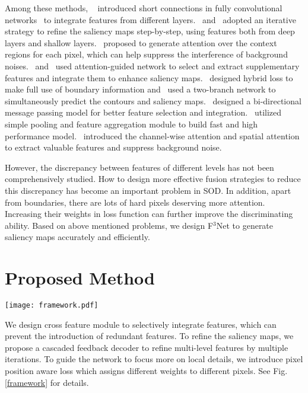 \documentclass[letterpaper]{article} %
\begin{document}
Among these methods, ~\cite{DSS} introduced short connections in fully convolutional networks~\cite{FCN} to integrate features from different layers.~\cite{R3Net} and~\cite{SRM} adopted an iterative strategy to refine the saliency maps step-by-step, using features both from deep layers and shallow layers.~\cite{PiCANet} proposed to generate attention over the context regions for each pixel, which can help suppress the interference of background noises.~\cite{RAS} and~\cite{PAGR} used attention-guided network to select and extract supplementary features and integrate them to enhance saliency maps.~\cite{BASNet} designed hybrid loss to make full use of boundary information and~\cite{AFNet} used a two-branch network to simultaneously predict the contours and saliency maps.~\cite{BMPM} designed a bi-directional message passing model for better feature selection and integration.~\cite{PoolNet} utilized simple pooling and feature aggregation module to build fast and high performance model.~\cite{PFAN} introduced the channel-wise attention and spatial attention to extract valuable features and suppress background noise.

However, the discrepancy between features of different levels has not been comprehensively studied. How to design more effective fusion strategies to reduce this discrepancy has become an important problem in SOD. In addition, apart from boundaries, there are lots of hard pixels deserving more attention. Increasing their weights in loss function can further improve the discriminating ability. Based on above mentioned problems, we design F$^3$Net to generate saliency maps accurately and efficiently.


\section{Proposed Method}
\begin{figure*}[htb]
  \centering
  \texttt{[image: framework.pdf]}
  \caption{An overview of proposed F$^3$Net. ResNet-50 is used as the backbone encoder. Cross feature module (CFM) is used as the basic module to fuse features of different layers. Cascaded feedback decoder (CFD) contains multiple sub-decoders to feedback and refine multi-level features. Multi-level supervision (MLS) helps to ease the optimization of F$^3$Net.}
  \label{framework}
\end{figure*}

We design cross feature module to selectively integrate features, which can prevent the introduction of redundant features. To refine the saliency maps, we propose a cascaded feedback decoder to refine multi-level features by multiple iterations. To guide the network to focus more on local details, we introduce pixel position aware loss which assigns different weights to different pixels. See Fig.\ref{framework} for details. 
\end{document}
